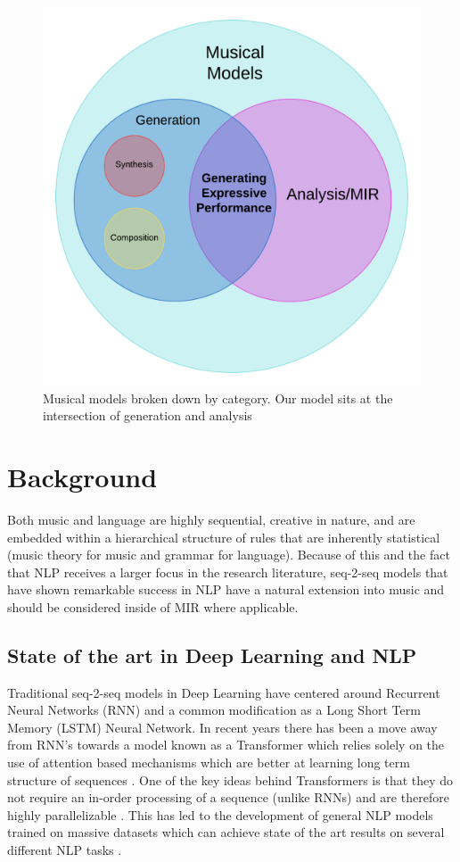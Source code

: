 \documentclass[letterpaper,12pt]{article}
\begin{document}
\begin{figure}[!htb]
	\center
	\includegraphics[width=0.6\linewidth]{images/musical-models.png}
	\caption{Musical models broken down by category. Our model sits at the intersection of generation and analysis}
	\label{musical-models}
\end{figure}

\section{Background}
Both music and language are highly sequential, creative in nature, and are embedded within a hierarchical structure of rules that are inherently statistical (music theory for music and grammar for language). Because of this and the fact that NLP receives a larger focus in the research literature, seq-2-seq models that have shown remarkable success in NLP have a natural extension into music and should be considered inside of MIR where applicable. 
\subsection{State of the art in Deep Learning and NLP}

Traditional seq-2-seq models in Deep Learning have centered around Recurrent Neural Networks (RNN) and a common modification as a Long Short Term Memory (LSTM) Neural Network. In recent years there has been a move away from RNN’s towards a model known as a Transformer which relies solely on the use of attention based mechanisms which are better at learning long term structure of sequences \cite{vaswani2017attention}. One of the key ideas behind Transformers is that they do not require an in-order processing of a sequence (unlike RNNs) and are therefore highly parallelizable \cite{devlin2018bert}. This has led to the development of general NLP models trained on massive datasets which can achieve state of the art results on several different NLP tasks \cite{devlin2018bert} \cite{radford2019language}. 
\end{document}
